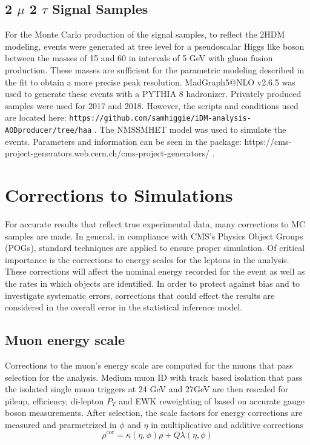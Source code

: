 \subsection{2 $\mu$ 2 $\tau$ Signal Samples }
For the Monte Carlo production of the signal samples, to reflect the 2HDM modeling, events were generated at tree level for a pseudoscalar Higgs like boson between the masses of 15 and 60 in intervals of 5 GeV with gluon fusion production. These masses are sufficient for the parametric modeling described in the fit to obtain a more precise peak resolution.
MadGraph5@NLO v2.6.5 was used to generate these events with a PYTHIA 8 hadronizer. Privately produced samples were used for 2017 and 2018. However, the scripts and conditions used are located here:
 \texttt{https://github.com/samhiggie/iDM-analysis-AODproducer/tree/haa} .
The NMSSMHET model was used to simulate the events. Parameters and information can be seen in the package:
https://cms-project-generators.web.cern.ch/cms-project-generators/ .
 


\section{Corrections to Simulations }

For accurate results that reflect true experimental data, many corrections to MC samples are made. In general, in compliance with CMS's Physics Object Groups (POGs), standard techniques are applied to ensure proper simulation. Of critical importance is the corrections to energy scales for the leptons in the analysis. These corrections will affect the nominal energy recorded for the event as well as the rates in which objects are identified.  In order to protect against bias and to investigate systematic errors, corrections that could effect the results are considered in the overall error in the statistical inference model.

\subsection{Muon energy scale}
Corrections to the muon's energy scale are computed for the muons that pass selection for the analysis. Medium muon ID with track based isolation that pass the isolated single muon triggers at 24 GeV and 27GeV are then rescaled for pileup, efficiency, di-lepton $P_T$ and EWK reweighting of based on accurate gauge boson measurements. After selection, the scale factors for energy corrections are measured and prarmetrized in $\phi$ and $\eta$ in multiplicative and additive corrections 
\[\rho^{\text{cor}}=\kappa(\eta,\phi)\rho+Q \lambda(\eta,\phi)\] 

